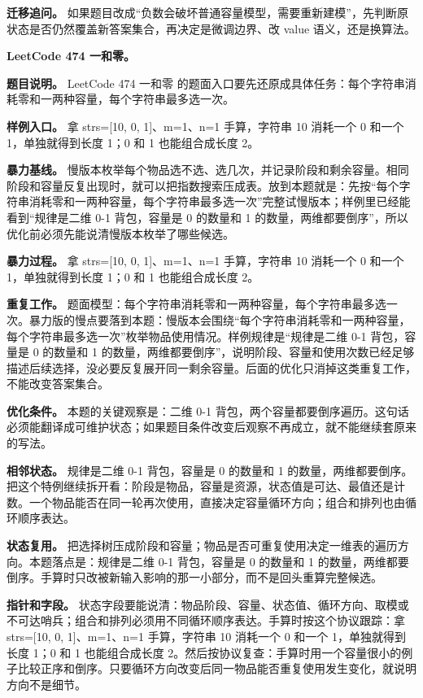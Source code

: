 \textbf{迁移追问。} 如果题目改成“负数会破坏普通容量模型，需要重新建模”，先判断原状态是否仍然覆盖新答案集合，再决定是微调边界、改 value 语义，还是换算法。

\noindent\textbf{LeetCode 474 一和零。}

\textbf{题目说明。} LeetCode 474 一和零 的题面入口要先还原成具体任务：每个字符串消耗零和一两种容量，每个字符串最多选一次。

\textbf{样例入口。} 拿 strs=[10, 0, 1]、m=1、n=1 手算，字符串 10 消耗一个 0 和一个 1，单独就得到长度 1；0 和 1 也能组合成长度 2。

\textbf{暴力基线。} 慢版本枚举每个物品选不选、选几次，并记录阶段和剩余容量。相同阶段和容量反复出现时，就可以把指数搜索压成表。放到本题就是：先按“每个字符串消耗零和一两种容量，每个字符串最多选一次”完整试慢版本；样例里已经能看到“规律是二维 0-1 背包，容量是 0 的数量和 1 的数量，两维都要倒序”，所以优化前必须先能说清慢版本枚举了哪些候选。

\textbf{暴力过程。} 拿 strs=[10, 0, 1]、m=1、n=1 手算，字符串 10 消耗一个 0 和一个 1，单独就得到长度 1；0 和 1 也能组合成长度 2。

\textbf{重复工作。} 题面模型：每个字符串消耗零和一两种容量，每个字符串最多选一次。暴力版的慢点要落到本题：慢版本会围绕“每个字符串消耗零和一两种容量，每个字符串最多选一次”枚举物品使用情况。样例规律是“规律是二维 0-1 背包，容量是 0 的数量和 1 的数量，两维都要倒序”，说明阶段、容量和使用次数已经足够描述后续选择，没必要反复展开同一剩余容量。后面的优化只消掉这类重复工作，不能改变答案集合。

\textbf{优化条件。} 本题的关键观察是：二维 0-1 背包，两个容量都要倒序遍历。这句话必须能翻译成可维护状态；如果题目条件改变后观察不再成立，就不能继续套原来的写法。

\textbf{相邻状态。} 规律是二维 0-1 背包，容量是 0 的数量和 1 的数量，两维都要倒序。把这个特例继续拆开看：阶段是物品，容量是资源，状态值是可达、最值还是计数。一个物品能否在同一轮再次使用，直接决定容量循环方向；组合和排列也由循环顺序表达。

\textbf{状态复用。} 把选择树压成阶段和容量；物品是否可重复使用决定一维表的遍历方向。本题落点是：规律是二维 0-1 背包，容量是 0 的数量和 1 的数量，两维都要倒序。手算时只改被新输入影响的那一小部分，而不是回头重算完整候选。

\textbf{指针和字段。} 状态字段要能说清：物品阶段、容量、状态值、循环方向、取模或不可达哨兵；组合和排列必须用不同循环顺序表达。手算时按这个协议跟踪：拿 strs=[10, 0, 1]、m=1、n=1 手算，字符串 10 消耗一个 0 和一个 1，单独就得到长度 1；0 和 1 也能组合成长度 2。然后按协议复查：手算时用一个容量很小的例子比较正序和倒序。只要循环方向改变后同一物品能否重复使用发生变化，就说明方向不是细节。


